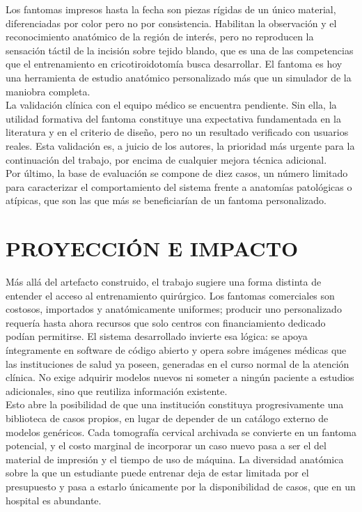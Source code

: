Los fantomas impresos hasta la fecha son piezas rígidas de un único material, diferenciadas por color pero no por consistencia. Habilitan la observación y el reconocimiento anatómico de la región de interés, pero no reproducen la sensación táctil de la incisión sobre tejido blando, que es una de las competencias que el entrenamiento en cricotiroidotomía busca desarrollar. El fantoma es hoy una herramienta de estudio anatómico personalizado más que un simulador de la maniobra completa.\\

La validación clínica con el equipo médico se encuentra pendiente. Sin ella, la utilidad formativa del fantoma constituye una expectativa fundamentada en la literatura y en el criterio de diseño, pero no un resultado verificado con usuarios reales. Esta validación es, a juicio de los autores, la prioridad más urgente para la continuación del trabajo, por encima de cualquier mejora técnica adicional.\\

Por último, la base de evaluación se compone de diez casos, un número limitado para caracterizar el comportamiento del sistema frente a anatomías patológicas o atípicas, que son las que más se beneficiarían de un fantoma personalizado.\\

\section{PROYECCIÓN E IMPACTO}

Más allá del artefacto construido, el trabajo sugiere una forma distinta de entender el acceso al entrenamiento quirúrgico. Los fantomas comerciales son costosos, importados y anatómicamente uniformes; producir uno personalizado requería hasta ahora recursos que solo centros con financiamiento dedicado podían permitirse. El sistema desarrollado invierte esa lógica: se apoya íntegramente en software de código abierto y opera sobre imágenes médicas que las instituciones de salud ya poseen, generadas en el curso normal de la atención clínica. No exige adquirir modelos nuevos ni someter a ningún paciente a estudios adicionales, sino que reutiliza información existente.\\

Esto abre la posibilidad de que una institución constituya progresivamente una biblioteca de casos propios, en lugar de depender de un catálogo externo de modelos genéricos. Cada tomografía cervical archivada se convierte en un fantoma potencial, y el costo marginal de incorporar un caso nuevo pasa a ser el del material de impresión y el tiempo de uso de máquina. La diversidad anatómica sobre la que un estudiante puede entrenar deja de estar limitada por el presupuesto y pasa a estarlo únicamente por la disponibilidad de casos, que en un hospital es abundante.\\

